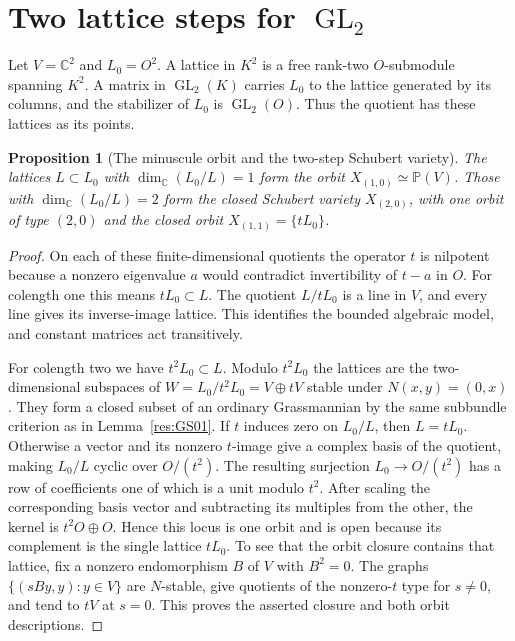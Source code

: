 \documentclass[11pt,oneside,openany]{book}
\newtheorem{proposition}[theorem]{Proposition}
\theoremstyle{definition}
\theoremstyle{remark}
\begin{document}
\section{Two lattice steps for \texorpdfstring{\(\operatorname{GL}_2\)}{GL(2)}}

Let \(V=\mathbb C^2\) and \(L_0=O^2\). A lattice in \(K^2\)
is a free rank-two \(O\)-submodule spanning \(K^2\).
A matrix in \(\operatorname{GL}_2(K)\) carries \(L_0\) to
the lattice generated by its columns, and the stabilizer
of \(L_0\) is \(\operatorname{GL}_2(O)\). Thus the quotient
has these lattices as its points.

\begin{proposition}[The minuscule orbit and the two-step Schubert variety]
\label{res:GS07}
The lattices \(L\subset L_0\) with
\(\dim_{\mathbb C}(L_0/L)=1\) form the orbit
\(X_{(1,0)}\simeq\mathbb P(V)\).
Those with \(\dim_{\mathbb C}(L_0/L)=2\) form the closed
Schubert variety \(X_{(2,0)}\), with one orbit of type
\((2,0)\) and the closed orbit \(X_{(1,1)}=\{tL_0\}\).
\end{proposition}

\begin{proof}
On each of these finite-dimensional quotients the
operator \(t\) is nilpotent because a nonzero eigenvalue
\(a\) would contradict invertibility of \(t-a\) in \(O\).
For colength one this means \(tL_0\subset L\).
The quotient \(L/tL_0\) is a line in \(V\), and every line
gives its inverse-image lattice. This identifies the
bounded algebraic model, and constant matrices act
transitively.

For colength two we have \(t^2L_0\subset L\).
Modulo \(t^2L_0\) the lattices are the two-dimensional
subspaces of \(W=L_0/t^2L_0=V\oplus tV\) stable under
\(N(x,y)=(0,x)\). They form a closed subset of an ordinary
Grassmannian by the same subbundle criterion as in
Lemma~\ref{res:GS01}. If \(t\) induces zero on \(L_0/L\),
then \(L=tL_0\). Otherwise a vector and its nonzero \(t\)-image
give a complex basis of the quotient, making \(L_0/L\) cyclic
over \(O/(t^2)\). The resulting
surjection \(L_0\to O/(t^2)\) has a row of coefficients
one of which is a unit modulo \(t^2\).
After scaling the corresponding basis vector and subtracting
its multiples from the other, the kernel is
\(t^2O\oplus O\). Hence this locus is one orbit and is
open because its complement is the single lattice \(tL_0\).
To see that the orbit closure contains that lattice,
fix a nonzero endomorphism \(B\) of \(V\) with \(B^2=0\).
The graphs \(\{(sBy,y):y\in V\}\) are \(N\)-stable, give
quotients of the nonzero-\(t\) type for \(s\ne0\), and tend
to \(tV\) at \(s=0\).
This proves the asserted closure and both orbit descriptions.
\end{proof}
\end{document}
